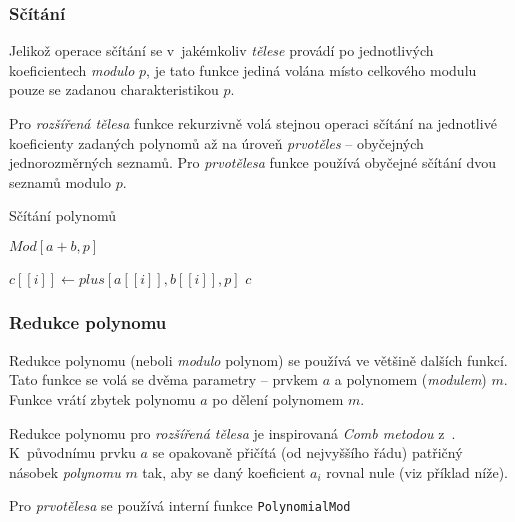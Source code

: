 \documentclass[thesis=M,czech,hidelinks]{FITthesis}[2012/06/26]
\newcommand{\0}{{\textcolor[gray]{0.80}{0}}}
\newenvironment{algoritmus}{
    \floatname{algorithm}{Algoritmus}
    \begin{algorithm}
}{\end{algorithm}}
\begin{document}
\subsubsection{Sčítání}
Jelikož operace sčítání se v~jakémkoliv \emph{tělese} provádí po jednotlivých
koeficientech \emph{modulo} $p$, je tato funkce jediná volána místo celkového
modulu pouze se zadanou charakteristikou $p$.

Pro \emph{rozšířená tělesa} funkce rekurzivně volá stejnou operaci sčítání na
jednotlivé koeficienty zadaných polynomů až na úroveň \emph{prvotěles} --
obyčejných jednorozměrných seznamů. Pro \emph{prvotělesa} funkce používá
obyčejné sčítání dvou seznamů modulo $p$.

\begin{algoritmus}[h!]
    \caption{Sčítání polynomů}
    \begin{algorithmic}[1]
        \State \Return $Mod[a+b,p]$
     \EndFunction
    \end{algorithmic}
    \begin{algorithmic}[1]
            \State $c[[i]] \gets plus[a[[i]],b[[i]],p]$
        \EndFor
        \State \Return $c$
     \EndFunction
    \end{algorithmic}
\end{algoritmus}

\subsubsection{Redukce polynomu}
Redukce polynomu (neboli \emph{modulo} polynom) se používá ve většině dalších
funkcí. Tato funkce se volá se dvěma parametry -- prvkem $a$ a polynomem
(\emph{modulem}) $m$. Funkce vrátí zbytek polynomu $a$ po dělení polynomem $m$.

Redukce polynomu pro \emph{rozšířená tělesa} je inspirovaná \emph{Comb metodou}
z~\cite{Paar_Efficient}. K~původnímu prvku $a$ se opakovaně přičítá (od
nejvyššího řádu) patřičný násobek \emph{polynomu} $m$ tak, aby se daný
koeficient $a_i$ rovnal nule (viz příklad níže).

Pro \emph{prvotělesa} se používá interní funkce \texttt{PolynomialMod}
\end{document}
